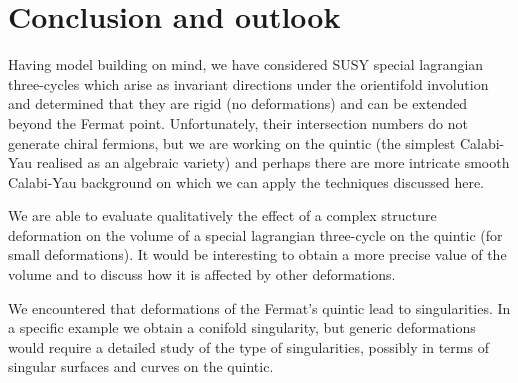 \chapter{Conclusion and outlook}

Having model building on mind, we have considered SUSY special lagrangian three-cycles which arise as invariant directions under the orientifold involution and determined that they  are rigid (no deformations) and can be extended beyond the Fermat point.
Unfortunately, their intersection numbers do not generate chiral fermions, but we are working on the quintic (the simplest Calabi-Yau realised as an algebraic variety) and perhaps there are more intricate smooth Calabi-Yau background on which we can apply the techniques discussed here.


We are able to evaluate qualitatively the effect of a complex structure deformation on the volume of a special lagrangian three-cycle on the quintic (for small deformations).
It would be interesting to obtain a more precise value of the volume and to discuss how it is affected by other deformations.

We encountered that deformations of the Fermat's quintic lead to singularities.
In a specific example  we obtain a conifold singularity, but generic deformations would require a detailed study of the type of singularities, possibly in terms  of singular surfaces and curves on the quintic.  
